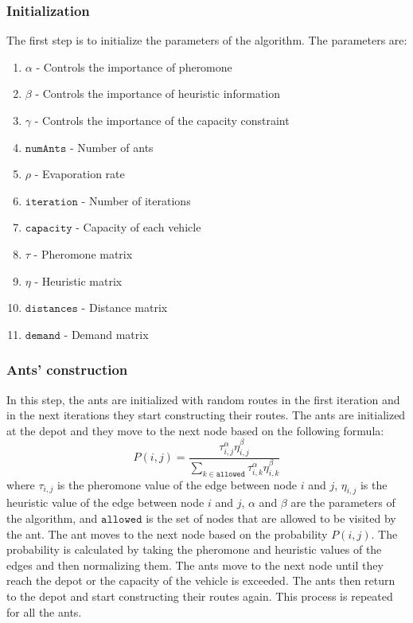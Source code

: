 \documentclass{article}
\begin{document}
\subsubsection{Initialization}
The first step is to initialize the parameters of the algorithm. The parameters are:
\begin{enumerate}
  \item $\alpha$ - Controls the importance of pheromone
  \item $\beta$ - Controls the importance of heuristic information
  \item $\gamma$ - Controls the importance of the capacity constraint
  \item $\texttt{numAnts}$ - Number of ants
  \item $\rho$ - Evaporation rate
  \item $\texttt{iteration}$ - Number of iterations
  \item $\texttt{capacity}$ - Capacity of each vehicle
  \item $\tau$ - Pheromone matrix
  \item $\eta$ - Heuristic matrix
  \item $\texttt{distances}$ - Distance matrix
  \item $\texttt{demand}$ - Demand matrix
\end{enumerate}

\subsubsection{Ants' construction}
In this step, the ants are initialized with random routes in the first iteration and in the next iterations they start constructing their routes. The ants are initialized at the depot and they move to the next node based on the following formula:
\begin{equation}
  P(i,j) = \frac{\tau_{i,j}^\alpha \eta_{i,j}^\beta}{\sum_{k \in \texttt{allowed}} \tau_{i,k}^\alpha \eta_{i,k}^\beta}
\end{equation}
where $\tau_{i,j}$ is the pheromone value of the edge between node $i$ and $j$, $\eta_{i,j}$ is the heuristic value of the edge between node $i$ and $j$, $\alpha$ and $\beta$ are the parameters of the algorithm, and $\texttt{allowed}$ is the set of nodes that are allowed to be visited by the ant. The ant moves to the next node based on the probability $P(i,j)$. The probability is calculated by taking the pheromone and heuristic values of the edges and then normalizing them. The ants move to the next node until they reach the depot or the capacity of the vehicle is exceeded. The ants then return to the depot and start constructing their routes again. This process is repeated for all the ants.
\end{document}
